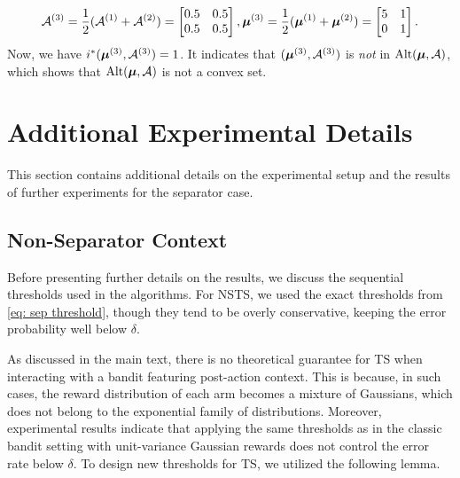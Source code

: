     \begin{align}
        \mathcal{A}^{(3)} = \frac{1}{2} (\mathcal{A}^{(1)}  + \mathcal{A}^{(2)}) = \begin{bmatrix}
                0.5 & 0.5 \\
                0.5 & 0.5
            \end{bmatrix},
        \boldsymbol{\mu}^{(3)} = \frac{1}{2} (\boldsymbol{\mu}^{(1)}  + \boldsymbol{\mu}^{(2)}) = \begin{bmatrix}
                    5 & 1 \\
                    0 & 1
        \end{bmatrix}.
    \end{align}
    Now, we have $i^*(\boldsymbol{\mu}^{(3)}, \mathcal{A}^{(3)}) = 1$. It indicates that $(\boldsymbol{\mu}^{(3)}, \mathcal{A}^{(3)})$ is \emph{not} in $\text{Alt}(\boldsymbol{\mu}, \mathcal{A})$, which shows that $\text{Alt}(\boldsymbol{\mu}, \mathcal{A})$ is not a convex set.
    
    
\section{Additional Experimental Details} \label{apd: experiment}

This section contains additional details on the experimental setup and the results of further experiments for the separator case. 
\subsection{Non-Separator Context} 
    ‌Before presenting further details on the results, we discuss the sequential thresholds used in the algorithms. For NSTS, we used the exact thresholds from \eqref{eq: sep threshold}, though they tend to be overly conservative, keeping the error probability well below $\delta$.
    
    As discussed in the main text, there is no theoretical guarantee for TS when interacting with a bandit featuring post-action context. This is because, in such cases, the reward distribution of each arm becomes a mixture of Gaussians, which does not belong to the exponential family of distributions. Moreover, experimental results indicate that applying the same thresholds as in the classic bandit setting with unit-variance Gaussian rewards does not control the error rate below $\delta$. To design new thresholds for TS, we utilized the following lemma.
    
